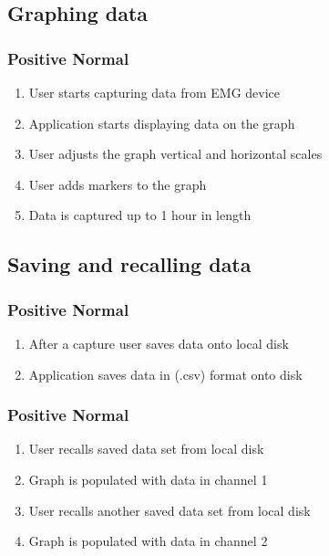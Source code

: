 \documentclass[12pt,a4paper]{article}
\begin{document}
\subsection{Graphing data}

\subsubsection{Positive Normal}

\begin{enumerate}
	\item User starts capturing data from EMG device
	\item Application starts displaying data on the graph
	\item User adjusts the graph vertical and horizontal scales
	\item User adds markers to the graph
	\item Data is captured up to 1 hour in length
\end{enumerate}

\subsection{Saving and recalling data}

\subsubsection{Positive Normal}

\begin{enumerate}
	\item After a capture user saves data onto local disk
	\item Application saves data in (.csv) format onto disk
\end{enumerate}

\subsubsection{Positive Normal}

\begin{enumerate}
	\item User recalls saved data set from local disk
	\item Graph is populated with data in channel 1
	\item User recalls another saved data set from local disk
	\item Graph is populated with data in channel 2
\end{enumerate}
\end{document}
